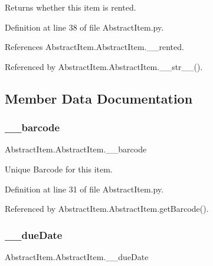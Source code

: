 Returns whether this item is rented. 



Definition at line 38 of file Abstract\+Item.\+py.



References Abstract\+Item.\+Abstract\+Item.\+\_\+\+\_\+rented.



Referenced by Abstract\+Item.\+Abstract\+Item.\+\_\+\+\_\+str\+\_\+\+\_\+().



\subsection{Member Data Documentation}
\mbox{\label{classAbstractItem_1_1AbstractItem_a37fae73390cb431a6395a07ce5b5a5c7}} 
\subsubsection{\texorpdfstring{\+\_\+\+\_\+barcode}{\_\_barcode}}
{\footnotesize\ttfamily Abstract\+Item.\+Abstract\+Item.\+\_\+\+\_\+barcode\hspace{0.3cm}{\ttfamily [private]}}



Unique Barcode for this item. 



Definition at line 31 of file Abstract\+Item.\+py.



Referenced by Abstract\+Item.\+Abstract\+Item.\+get\+Barcode().

\mbox{\label{classAbstractItem_1_1AbstractItem_a6975f7e62b35b3162dd9c3aef089c1a3}} 
\subsubsection{\texorpdfstring{\+\_\+\+\_\+due\+Date}{\_\_dueDate}}
{\footnotesize\ttfamily Abstract\+Item.\+Abstract\+Item.\+\_\+\+\_\+due\+Date\hspace{0.3cm}{\ttfamily [private]}}



